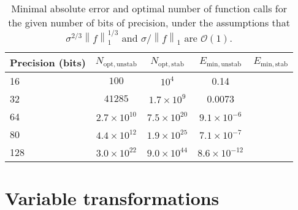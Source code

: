 \documentclass{ansarticle}
\begin{document}
\begin{table}
  \begin{center}
    \begin{tabular}{lcccc}
      \toprule
   Precision (bits)  & $N_{\mathrm{opt, unstab}}$ &  $N_{\mathrm{opt, stab}}$ & $E_{\mathrm{min, unstab}}$ & $E_{\mathrm{min, stab}}$  \\
      \hline
      16 & $100$                                                     &  $10^4$                              & 0.14  & \\
      32 & $41285$                                                 &  $1.7\times 10^{9}$                              & 0.0073   & \\
      64 & $2.7\times 10^{10}$                               &  $7.5 \times 10^{20}$                             &  $9.1\times 10^{-6}$ & \\
      80 & $4.4\times 10^{12}$                               &  $1.9\times 10^{25}$                              & $7.1\times 10^{-7}$   & \\
      128 & $3.0\times 10^{22}$                             &  $9.0\times 10^{44}$                             & $8.6\times 10^{-12}$  & \\
      \bottomrule
    \end{tabular}
  \end{center}
    \caption{Minimal absolute error and optimal number of function calls for the given number of bits of precision, under the assumptions that $\sigma^{2/3}\left\|f\right\|_{1}^{1/3}$ and $\sigma/\left\|f\right\|_1$ are $\mathcal{O}(1)$.}
    \label{tab:errorestimates}
\end{table}


\section{Variable transformations}
\end{document}
